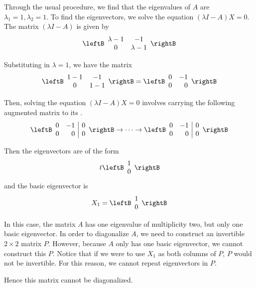\begin{solution}
Through the usual procedure, we find that the eigenvalues of $A$ are $\lambda_1 =1, \lambda_2=1.$ 
To find the eigenvectors, we solve the equation $\left(\lambda I - A \right) X = 0$.
The matrix $\left(\lambda I -A \right)$ is given by 
\begin{equation*}
\leftB
\begin{array}{cc}
\lambda - 1 & -1 \\
0 & \lambda - 1
\end{array}
\rightB
\end{equation*}

Substituting in $\lambda = 1$, we have the matrix
\begin{equation*}
\leftB
\begin{array}{cc}
1 - 1 & -1 \\
0 & 1 - 1
\end{array}
\rightB
=
\leftB
\begin{array}{rr}
0 & -1 \\
0 & 0
\end{array}
\rightB
\end{equation*}

Then, solving the equation $\left(\lambda I - A\right) X = 0$ 
involves carrying the following augmented matrix to its \rref. 
\begin{equation*}
\leftB
\begin{array}{rr|r}
0 & -1 & 0 \\
0 & 0 & 0
\end{array}
\rightB 
\rightarrow \cdots \rightarrow
\leftB
\begin{array}{rr|r}
0 & -1 & 0 \\
0 & 0 & 0
\end{array}
\rightB 
\end{equation*}

Then the eigenvectors are of the form
\begin{equation*}
t\leftB
\begin{array}{r}
1 \\
0
\end{array}
\rightB
\end{equation*}
and the basic eigenvector is 
\begin{equation*}
X_1
=
\leftB
\begin{array}{r}
1 \\
0
\end{array}
\rightB
\end{equation*}

In this case, the matrix $A$ has one eigenvalue of multiplicity two, 
but only one basic eigenvector. In order to diagonalize $A$, we need to construct
an invertible $2\times 2$ matrix $P$. However, because $A$ only has one basic eigenvector,
we cannot construct this $P$. Notice that if we were to use $X_1$ as both columns of $P$, $P$ would not be invertible. For this reason, we cannot repeat eigenvectors in $P$.

Hence this matrix cannot be diagonalized. 
\end{solution}

